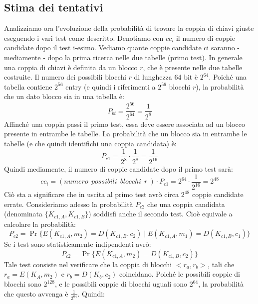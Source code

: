 \subsection{Stima dei tentativi}
Analizziamo ora l'evoluzione della probabilità di trovare la coppia di chiavi giuste eseguendo i vari test come descritto. Denotiamo con $cc_i$ il numero di coppie candidate dopo il test i-esimo. Vediamo quante coppie candidate ci saranno - mediamente - dopo la prima ricerca nelle due tabelle (primo test).
\newline \newline
In generale una coppia di chiavi è definita da un blocco $r$, che è presente nelle due tabelle costruite. Il numero dei possibili blocchi $r$ di lunghezza 64 bit è $2^{64}$. Poiché una tabella contiene $2^{56}$ entry (e quindi i riferimenti a $2^{56}$ blocchi $r$), la probabilità che un dato blocco sia in una tabella è:
\begin{equation}
P_{bt} = \frac{2^{56}}{2^{64}} = \frac{1}{2^8}
\end{equation}
Affinché una coppia passi il primo test, essa deve essere associata ad un blocco presente in entrambe le tabelle. La probabilità che un blocco sia in entrambe le tabelle (e che quindi identifichi una coppia candidata) è:
\begin{equation}
P_{c1} = \frac{1}{2^8} \cdot \frac{1}{2^8} = \frac{1}{2^{16}}
\end{equation}
Quindi mediamente, il numero di coppie candidate dopo il primo test sarà:
\begin{equation}
cc_i = (numero \: \: possibili \: \: blocchi \: \: r \:) \cdot P_{c1} = 2^{64} \cdot \frac{1}{2^{16}} = 2^{48}
\end{equation}
Ciò sta a significare che in uscita al primo test avrò circa $2^{48}$ coppie candidate errate.
\newline \newline
Consideriamo adesso la probabilità $P_{c2}$ che una coppia candidata (denominata $\{ K_{c1,A},K_{c1,B} \}$) soddisfi anche il secondo test. Cioè equivale a calcolare la probabilità:
\begin{equation}
P_{c2} = \Pr\{E(K_{c1,A}, m_{2}) = D(K_{c1,B}, c_{2}) \mid E(K_{c1,A}, m_{1}) = D(K_{c1,B}, c_{1})\}
\end{equation}
Se i test sono statisticamente indipendenti avrò:
\begin{equation}
P_{c2} = \Pr\{E(K_{c1,A}, m_{2}) = D(K_{c1,B}, c_{2})\}
\end{equation}
Tale test consiste nel verificare che la coppia di blocchi $<r_a,r_b>$, tali che $r_a = E(K_{A}, m_{2})$ e $r_b = D(K_{b}, c_{2})$ coincidano. Poiché le possibili coppie di blocchi sono $2^{128}$, e le possibili coppie di blocchi uguali sono $2^{64}$, la probabilità che questo avvenga è $\frac{1}{2^{64}}$. Quindi:
